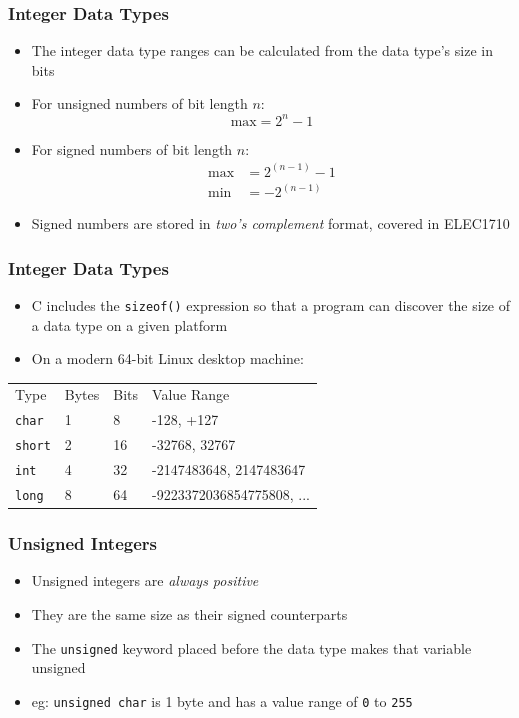 \documentclass[14pt]{beamer}
\begin{document}
\begin{frame}
\frametitle{Integer Data Types}
\begin{itemize}
\item The integer data type ranges can be calculated from the data type's size in bits
\item For unsigned numbers of bit length $n$:
\begin{equation}
\textrm{max} = 2^{n} - 1
\end{equation}
\item For signed numbers of bit length $n$:
\begin{align}
\textrm{max} &= 2^{(n-1)} - 1 \\
\textrm{min} &= -2^{(n-1)}
\end{align}
\item Signed numbers are stored in \textit{two's complement} format, covered in ELEC1710
\end{itemize}
\end{frame}

\begin{frame}
\frametitle{Integer Data Types}
\begin{itemize}
\item C includes the \texttt{sizeof()} expression so that a program can discover the size of a data type on a given platform
\item On a modern 64-bit Linux desktop machine:
\end{itemize}
\begin{table}[]
\begin{tabular}{llll}
Type & Bytes & Bits & Value Range                               \\
\texttt{char}      & 1            & 8           & -128, +127                                \\
\texttt{short}     & 2            & 16          & -32768, 32767      \\
\texttt{int}       & 4            & 32          & -2147483648, 2147483647                   \\
\texttt{long}      & 8            & 64          & -9223372036854775808, ...
\end{tabular}
\end{table}
\end{frame}

\begin{frame}
\frametitle{Unsigned Integers}
\begin{itemize}
\item Unsigned integers are \textit{always positive}
\item They are the same size as their signed counterparts
\item The \texttt{unsigned} keyword placed before the data type makes that variable unsigned
\item eg: \texttt{unsigned char} is 1 byte and has a value range of \texttt{0} to \texttt{255}
\end{itemize}
\end{frame}
\end{document}
